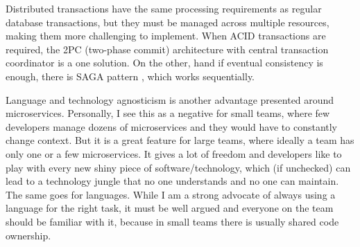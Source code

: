 
Distributed transactions have the same processing requirements as regular database transactions, but they must be managed across multiple resources, making them more challenging to implement. When ACID transactions are required, the 2PC \cite{2PC_PATTERN} (two-phase commit) architecture with central transaction coordinator is a one solution. On the other, hand if eventual consistency is enough, there is SAGA pattern \cite{SAGA_PATTERN}, which works sequentially.

Language and technology agnosticism is another advantage presented around microservices. Personally, I see this as a negative for small teams, where few developers manage dozens of microservices and they would have to constantly change context. But it is a great feature for large teams, where ideally a team has only one or a few microservices. It gives a lot of freedom and developers like to play with every new shiny piece of software/technology, which (if unchecked) can lead to a technology jungle that no one understands and no one can maintain. The same goes for languages. While I am a strong advocate of always using a language for the right task, it must be well argued and everyone on the team should be familiar with it, because in small teams there is usually shared code ownership.